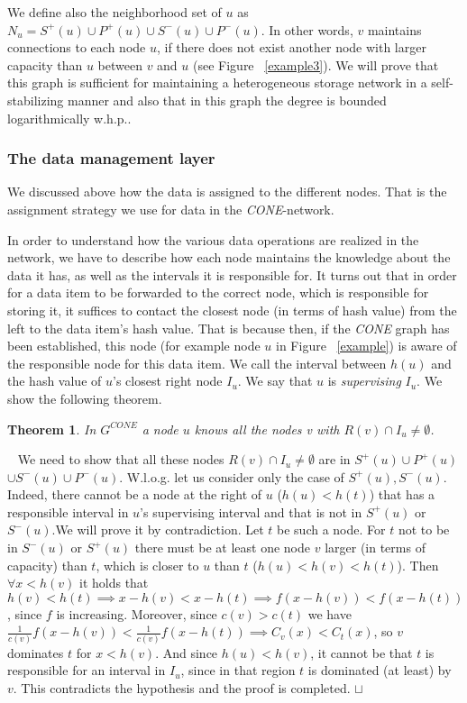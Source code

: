 \documentclass[11pt]{article}
\newtheorem{theorem}{Theorem}[section]
\newcommand{\sq}{\hbox{\rlap{$\sqcap$}$\sqcup$}}
\newcommand{\qed}{\hspace*{\fill}\sq}
\newenvironment{proof}{\noindent {\bf Proof.}\ }{\qed\par\vskip 4mm\par}
\begin{document}
We define also the neighborhood set of $u$ as $N_u= S^+(u) \cup P^+(u) \cup S^-(u) \cup P^-(u)$.
In other words, $v$ maintains connections to each node $u$, if there does not exist another node with larger capacity than $u$ between $v$ and $u$ (see Figure ~\ref{example3}).
We will prove that this graph is sufficient for maintaining a heterogeneous storage network in a self-stabilizing manner and also that in this graph the degree is bounded logarithmically w.h.p..

\subsubsection{The data management layer}

We discussed above how the data is assigned to the different nodes. That is the assignment strategy we use for data in the \emph{CONE}-network.

In order to understand how the various data operations are realized in the network, we have to describe how each node maintains the knowledge about the data it
has, as well as the intervals it is responsible for.
It turns out that in order for a data item to be forwarded to the correct node, which is responsible for storing it, it suffices to contact the closest node (in terms of hash value) from the left to the data item's hash value.
That is because then, if the \emph{CONE} graph has been established, this node (for example node $u$ in  Figure ~\ref{example}) is aware of the responsible node for this data item. We call the interval between $h(u)$ and the hash value of $u$'s closest right node $I_u$. We say that $u$ is \emph{supervising} $I_u$.
We show the following theorem.



\begin{theorem}\label{theo:responsibility}
In $G^{CONE}$ a node $u$ knows all the nodes v with $R(v) \cap I_u \neq \emptyset $.
\end{theorem}

\begin{proof}
We need to show that all these nodes $R(v) \cap I_u \neq \emptyset $ are in $ S^+(u) \cup P^+(u) $ $\cup S^-(u) \cup P^-(u)$. 
W.l.o.g. let us consider only the case of $S^+(u), S^-(u)$.
Indeed, there cannot be a node at the right of $u$ ($h(u)<h(t)$) that has a responsible interval in $u$'s supervising interval and that is not in $ S^+(u)$ or $ S^-(u)$.We will prove it by contradiction.
Let $t$ be such a node. For $t$ not to be in $ S^-(u)$ or $ S^+(u)$ there must be at least one node $v$ larger (in terms of capacity) than $t$, which is closer to $u$ than $t$ ($h(u)<h(v)<h(t)$). Then $\forall x<h(v)$ it holds that $h(v)<h(t) \implies x-h(v)<x-h(t) \implies f(x-h(v))<f(x-h(t)) $, since $f$ is increasing. Moreover, since $c(v)>c(t)$ we have $\frac{1}{c(v)}f(x-h(v))<\frac{1}{c(v)}f(x-h(t))\implies C_v(x)<C_t(x)$, so $v$ dominates $t$ for $x<h(v)$. And since $h(u)<h(v)$, it cannot be that $t$ is responsible for an interval in $I_u$, since in that region $t$ is dominated (at least) by $v$.
This contradicts the hypothesis and the proof is completed.
\end{proof}
\end{document}

